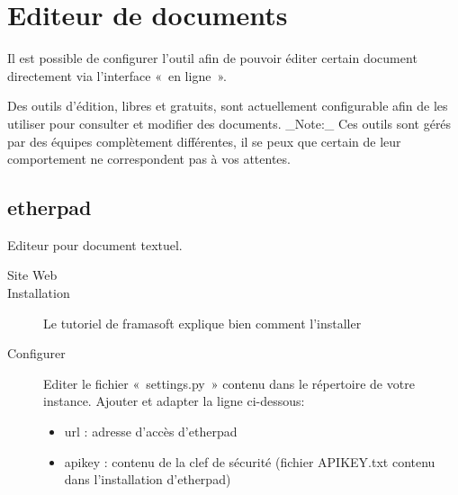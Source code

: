 \documentclass[letterpaper,10pt,french]{sphinxmanual}
\begin{document}
\section{Editeur de documents}
\label{\detokenize{documents/editor:editeur-de-documents}}\label{\detokenize{documents/editor::doc}}
Il est possible de configurer l’outil afin de pouvoir éditer certain document directement via l’interface « en ligne ».

Des outils d’édition, libres et gratuits, sont actuellement configurable afin de les utiliser pour consulter et modifier des documents.
\_Note:\_ Ces outils sont gérés par des équipes complètement différentes, il se peux que certain de leur comportement ne correspondent pas à vos attentes.


\subsection{etherpad}
\label{\detokenize{documents/editor:etherpad}}
Editeur pour document textuel.
\begin{description}
\item[{Site Web}] \leavevmode
{}

\item[{Installation}] \leavevmode
Le tutoriel de framasoft explique bien comment l’installer

\item[{Configurer}] \leavevmode
Editer le fichier « settings.py » contenu dans le répertoire de votre instance.
Ajouter et adapter la ligne ci-dessous:
\begin{itemize}
\item {} 
url : adresse d’accès d’etherpad

\item {} 
apikey : contenu de la clef de sécurité (fichier APIKEY.txt contenu dans l’installation d’etherpad)

\end{itemize}

\end{description}
\end{document}
